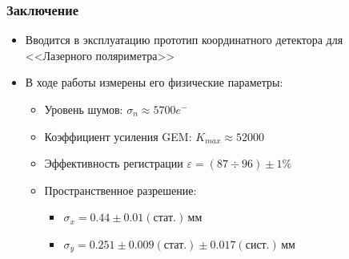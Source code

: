 \documentclass[14pt]{beamer}
\begin{document}
\begin{frame}[t]
\frametitle{Заключение}
\begin{itemize}
	\item Вводится в эксплуатацию прототип координатного детектора для  <<Лазерного поляриметра>>
	\item В ходе работы измерены его физические параметры: 
	\begin{itemize}
		\setlength\itemsep{0.5em}
		\item Уровень шумов: $\sigma_{n} \approx 5700 e^{-}$
		\item Коэффициент усиления GEM: $K_{max} \approx 52000$
		\item Эффективность регистрации $\varepsilon = (87 \div 96) \pm 1 \%$
		\item Пространственное разрешение:
		\begin{itemize}
			\setlength\itemsep{0.5em}
			\item $\sigma_x = 0.44\pm0.01(\text{стат.})$\,мм
			\item $\sigma_y = 0.251\pm0.009(\text{стат.})\pm0.017(\text{сист.})$\,мм
		\end{itemize}
	\end{itemize}
\end{itemize}
\end{frame}
\end{document}
